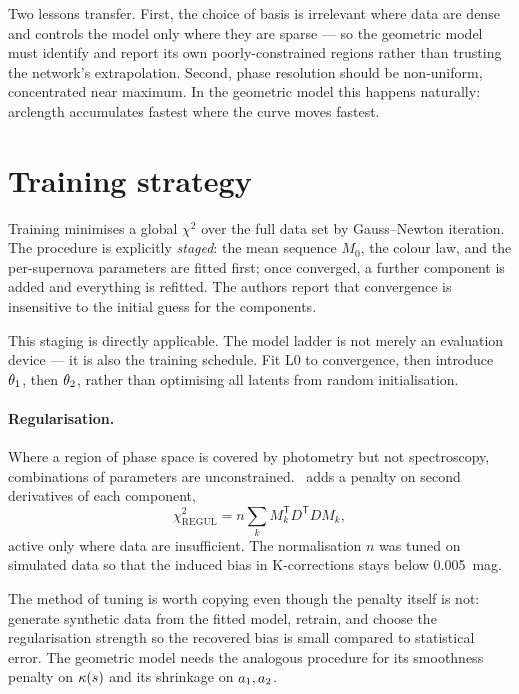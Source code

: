 \documentclass[11pt]{article}
\begin{document}
Two lessons transfer. First, the choice of basis is irrelevant where data are
dense and controls the model only where they are sparse --- so the geometric
model must identify and report its own poorly-constrained regions rather than
trusting the network's extrapolation. Second, phase resolution should be
non-uniform, concentrated near maximum. In the geometric model this happens
naturally: arclength accumulates fastest where the curve moves fastest.

\section{Training strategy}

Training minimises a global $\chi^{2}$ over the full data set by Gauss--Newton
iteration. The procedure is explicitly \emph{staged}: the mean sequence
$M_{0}$, the colour law, and the per-supernova parameters are fitted first;
once converged, a further component is added and everything is refitted. The
authors report that convergence is insensitive to the initial guess for the
components.

This staging is directly applicable. The model ladder is not merely an
evaluation device --- it is also the training schedule. Fit L0 to convergence,
then introduce $\theta_{1}$, then $\theta_{2}$, rather than optimising all
latents from random initialisation.

\paragraph{Regularisation.} Where a region of phase space is covered by
photometry but not spectroscopy, combinations of parameters are unconstrained.
\salt\ adds a penalty on second derivatives of each component,
\begin{equation}
  \chi^{2}_{\mathrm{REGUL}} = n \sum_{k} M_{k}^{\mathsf{T}} D^{\mathsf{T}} D M_{k},
\end{equation}
active only where data are insufficient. The normalisation $n$ was tuned on
simulated data so that the induced bias in K-corrections stays below
0.005~mag.

The method of tuning is worth copying even though the penalty itself is not:
generate synthetic data from the fitted model, retrain, and choose the
regularisation strength so the recovered bias is small compared to statistical
error. The geometric model needs the analogous procedure for its smoothness
penalty on $\kappa(s)$ and its shrinkage on $a_{1},a_{2}$.
\end{document}
